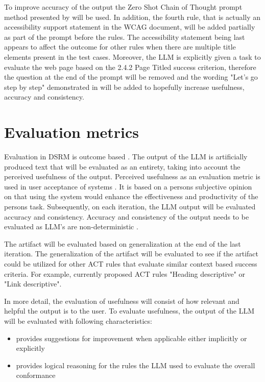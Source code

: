 To improve accuracy of the output the Zero Shot Chain of Thought prompt method presented by \textcite{kojima2023large} will be used. In addition, the fourth rule, that is actually an accessibility support statement in the WCAG \textcite{act_rule_g88} document, will be added partially as part of the prompt before the rules. The accessibility statement being last appears to affect the outcome for other rules when there are multiple title elements present in the test cases. Moreover, the LLM is explicitly given a task to evaluate the web page based on the 2.4.2 Page Titled success criterion, therefore the question at the end of the prompt will be removed and the wording "Let's go step by step" demonstrated in \textcite{kojima2023large} will be added to hopefully increase usefulness, accuracy and consistency.

\section{Evaluation metrics}

Evaluation in DSRM is outcome based \citep{design_science_eval}. The output of the LLM is artificially produced text that will be evaluated as an entirety, taking into account the perceived usefulness of the output. Perceived usefulness as an evaluation metric is used in user acceptance of systems \citep{perceived_usefulness}. It is based on a persons subjective opinion on that using the system would enhance the effectiveness and productivity of the persons task. Subsequently, on each iteration, the LLM output will be evaluated accuracy and consistency. Accuracy and consistency of the output needs to be evaluated as LLM's are non-deterministic \citep{ouyang2023llm, power_determinism}.

The artifact will be evaluated based on generalization at the end of the last iteration. The generalization of the artifact will be evaluated to see if the artifact could be utilized for other ACT rules that evaluate similar context based success criteria. For example, currently proposed ACT rules "Heading descriptive" or "Link descriptive".

In more detail, the evaluation of usefulness will consist of how relevant and helpful the output is to the user. To evaluate usefulness, the output of the LLM will be evaluated with following characteristics: 

\begin{itemize}
    \item provides suggestions for improvement when applicable either implicitly or explicitly
    \item provides logical reasoning for the rules the LLM used to evaluate the overall conformance
\end{itemize}

